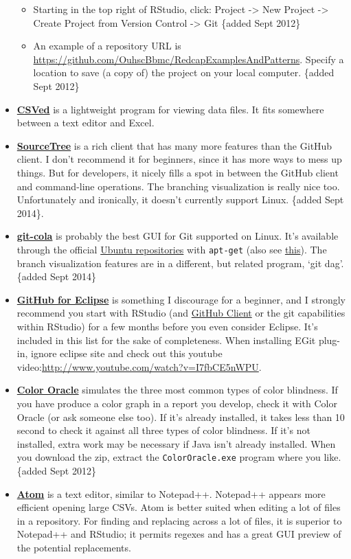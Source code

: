 \documentclass[
]{book}
\providecommand{\tightlist}{%
  \setlength{\itemsep}{0pt}\setlength{\parskip}{0pt}}
\begin{document}
\begin{itemize}
  \begin{itemize}
  \tightlist
  \item
    Starting in the top right of RStudio, click: Project -\textgreater{} New Project -\textgreater{} Create Project from Version Control -\textgreater{} Git \{added Sept 2012\}
  \item
    An example of a repository URL is \url{https://github.com/OuhscBbmc/RedcapExamplesAndPatterns}. Specify a location to save (a copy of) the project on your local computer. \{added Sept 2012\}
  \end{itemize}
\item
  \textbf{\href{http://csved.sjfrancke.nl/}{CSVed}} is a lightweight program for viewing data files. It fits somewhere between a text editor and Excel.
\item
  \textbf{\href{http://www.sourcetreeapp.com/}{SourceTree}} is a rich client that has many more features than the GitHub client. I don't recommend it for beginners, since it has more ways to mess up things. But for developers, it nicely fills a spot in between the GitHub client and command-line operations. The branching visualization is really nice too. Unfortunately and ironically, it doesn't currently support Linux. \{added Sept 2014\}.
\item
  \textbf{\href{http://git-cola.github.io/}{git-cola}} is probably the best GUI for Git supported on Linux. It's available through the official \href{http://packages.ubuntu.com/search?keywords=git-cola}{Ubuntu repositories} with \texttt{apt-get} (also see \href{https://apps.ubuntu.com/cat/applications/git-cola/}{this}). The branch visualization features are in a different, but related program, `git dag'. \{added Sept 2014\}
\item
  \textbf{\href{http://eclipse.github.com/}{GitHub for Eclipse}} is something I discourage for a beginner, and I strongly recommend you start with RStudio (and \href{http://windows.github.com/}{GitHub Client} or the git capabilities within RStudio) for a few months before you even consider Eclipse. It's included in this list for the sake of completeness. When installing EGit plug-in, ignore eclipse site and check out this youtube video:\url{http://www.youtube.com/watch?v=I7fbCE5nWPU}.
\item
  \textbf{\href{http://colororacle.org/}{Color Oracle}} simulates the three most common types of color blindness. If you have produce a color graph in a report you develop, check it with Color Oracle (or ask someone else too). If it's already installed, it takes less than 10 second to check it against all three types of color blindness. If it's not installed, extra work may be necessary if Java isn't already installed. When you download the zip, extract the \texttt{ColorOracle.exe} program where you like. \{added Sept 2012\}
\item
  \textbf{\href{https://atom.io/}{Atom}} is a text editor, similar to Notepad++. Notepad++ appears more efficient opening large CSVs. Atom is better suited when editing a lot of files in a repository. For finding and replacing across a lot of files, it is superior to Notepad++ and RStudio; it permits regexes and has a great GUI preview of the potential replacements.


\end{itemize}
\end{document}
